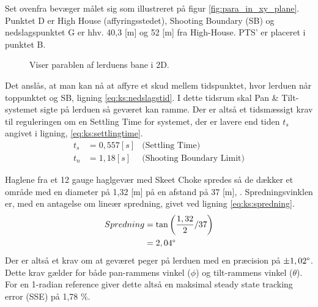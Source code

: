 Set ovenfra bevæger målet sig som illustreret på figur \ref{fig:para_in_xy_plane}. Punktet D er High House (affyringsstedet), Shooting Boundary (SB) og nedslagspunktet G er hhv. 40,3 [m] og 52 [m] fra High-House. PTS' er placeret i punktet B.\\
\begin{figure}[h!]
\centering
{}
\caption[Lerduens parabel i 2D]{Viser parablen af lerduens bane i 2D.}
\end{figure}
Det anslås, at man kan nå at affyre et skud mellem tidspunktet,
hvor lerduen når toppunktet og SB, ligning \ref{eq:ks:nedslagstid}.
I dette tidsrum skal Pan \& Tilt-systemet sigte på lerduen så geværet kan ramme.
Der er altså et tidsmæssigt krav til reguleringen om en Settling Time for systemet,
der er lavere end tiden \(t_{s}\) angivet i ligning, \ref{eq:ks:settlingtime}.
\begin{align}
  t_{s} &= 0,557 [s] &\text{(Settling Time)}
  \label{eq:ks:settlingtime}
\\
  t_{n} &= 1,18 [s] &\text{(Shooting Boundary Limit)}
  \label{eq:ks:nedslagstid}
\end{align}

Haglene fra et 12 gauge haglgevær med Skeet Choke spredes så de dækker et område
med en diameter på 1,32 [m] på en afstand på 37 [m], \citep[Pattern and choke]{patternandchoke}.
Spredningsvinklen er, med en antagelse om lineær spredning, givet ved ligning \ref{eq:ks:spredning}.
\begin{align}
  Spredning &= \tan \left(\frac{1,32}{2} / 37 \right) \\
  &= 2,04 \degree
  \label{eq:ks:spredning}
\end{align}
Der er altså et krav om at geværet peger på lerduen med en præcision på \(\pm 1,02 \degree\).
Dette krav gælder for både pan-rammens vinkel (\(\phi\)) og tilt-rammens vinkel (\(\theta\)).
For en 1-radian reference giver dette altså en maksimal steady state tracking error (SSE) på 1,78 \%.

